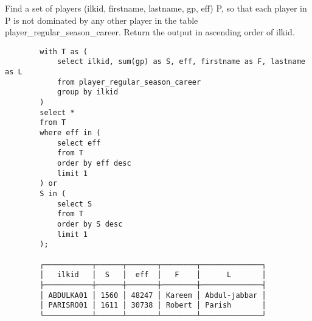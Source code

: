 \documentclass[12pt]{amsart}   	%
\begin{document}
\begin{enumerate}
        Find a set of players (ilkid, firstname, lastname, gp, eff) P, so that each player in P is not dominated by any other player in the table player\_regular\_season\_career. Return the output in ascending order of ilkid. 
        
        \begin{verbatim}
        with T as (
            select ilkid, sum(gp) as S, eff, firstname as F, lastname as L 
            from player_regular_season_career 
            group by ilkid
        )
        select * 
        from T 
        where eff in (
            select eff 
            from T 
            order by eff desc 
            limit 1
        ) or 
        S in (
            select S 
            from T 
            order by S desc 
            limit 1
        );
        
        ┌───────────┬──────┬───────┬────────┬──────────────┐
        │   ilkid   │  S   │  eff  │   F    │      L       │
        ├───────────┼──────┼───────┼────────┼──────────────┤
        │ ABDULKA01 │ 1560 │ 48247 │ Kareem │ Abdul-jabbar │
        │ PARISRO01 │ 1611 │ 30738 │ Robert │ Parish       │
        └───────────┴──────┴───────┴────────┴──────────────┘
\end{verbatim}
        
        
    \end{enumerate}
\end{document}
